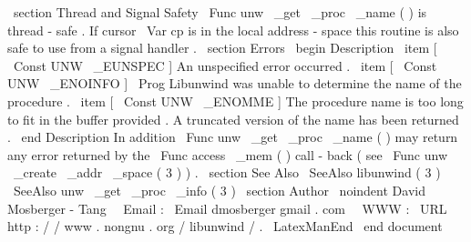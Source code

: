 \
section
{
Thread
and
Signal
Safety
}
\
Func
{
unw
\
_get
\
_proc
\
_name
}
(
)
is
thread
-
safe
.
If
cursor
\
Var
{
cp
}
is
in
the
local
address
-
space
this
routine
is
also
safe
to
use
from
a
signal
handler
.
\
section
{
Errors
}
\
begin
{
Description
}
\
item
[
\
Const
{
UNW
\
_EUNSPEC
}
]
An
unspecified
error
occurred
.
\
item
[
\
Const
{
UNW
\
_ENOINFO
}
]
\
Prog
{
Libunwind
}
was
unable
to
determine
the
name
of
the
procedure
.
\
item
[
\
Const
{
UNW
\
_ENOMME
}
]
The
procedure
name
is
too
long
to
fit
in
the
buffer
provided
.
A
truncated
version
of
the
name
has
been
returned
.
\
end
{
Description
}
In
addition
\
Func
{
unw
\
_get
\
_proc
\
_name
}
(
)
may
return
any
error
returned
by
the
\
Func
{
access
\
_mem
}
(
)
call
-
back
(
see
\
Func
{
unw
\
_create
\
_addr
\
_space
}
(
3
)
)
.
\
section
{
See
Also
}
\
SeeAlso
{
libunwind
(
3
)
}
\
SeeAlso
{
unw
\
_get
\
_proc
\
_info
(
3
)
}
\
section
{
Author
}
\
noindent
David
Mosberger
-
Tang
\
\
Email
:
\
Email
{
dmosberger
gmail
.
com
}
\
\
WWW
:
\
URL
{
http
:
/
/
www
.
nongnu
.
org
/
libunwind
/
}
.
\
LatexManEnd
\
end
{
document
}
